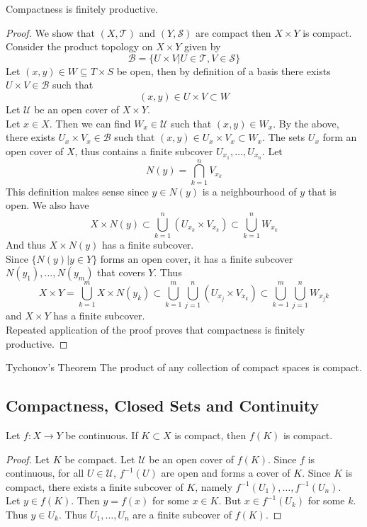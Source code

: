 \documentclass[a4paper]{article}
\begin{document}
\begin{prp}{}{} Compactness is finitely productive. 
\begin{proof}
We show that $(X,\mathcal{T})$ and $(Y,\mathcal{S})$ are compact then $X\times Y$ is compact. Consider the product topology on $X\times Y$ given by $$\mathcal{B}=\{U\times V|U\in\mathcal{T},V\in\mathcal{S}\}$$ Let $(x,y)\in W\subseteq T\times S$ be open, then by definition of a basis there exists $U\times V\in\mathcal{B}$ such that $$(x,y)\in U\times V\subset W$$ Let $\mathcal{U}$ be an open cover of $X\times Y$. \\
Let $x\in X$. Then we can find $W_x\in\mathcal{U}$ such that $(x,y)\in W_x$. By the above, there exists $U_x\times V_x\in\mathcal{B}$ such that $(x,y)\in U_x\times V_x\subset W_x$. The sets $U_x$ form an open cover of $X$, thus contains a finite subcover $U_{x_1},\dots,U_{x_n}$. Let $$N(y)=\bigcap_{k=1}^nV_{x_k}$$ This definition makes sense since $y\in N(y)$ is a neighbourhood of $y$ that is open. We also have $$X\times N(y)\subset\bigcup_{k=1}^n(U_{x_k}\times V_{x_k})\subset\bigcup_{k=1}^nW_{x_k}$$ And thus $X\times N(y)$ has a finite subcover. \\
Since $\{N(y)|y\in Y\}$ forms an open cover, it has a finite subcover $N(y_1),\dots,N(y_m)$ that covers $Y$. Thus $$X\times Y=\bigcup_{k=1}^mX\times N(y_k)\subset\bigcup_{k=1}^m\bigcup_{j=1}^n(U_{x_j}\times V_{x_k})\subset\bigcup_{k=1}^m\bigcup_{j=1}^nW_{x_jk}$$ and $X\times Y$ has a finite subcover. \\
Repeated application of the proof proves that compactness is finitely productive. 
\end{proof}
\end{prp}

\begin{thm}{Tychonov's Theorem}{} The product of any collection of compact spaces is compact. 
\end{thm}

\subsection{Compactness, Closed Sets and Continuity}
\begin{prp}{}{} Let $f:X\to Y$ be continuous. If $K\subset X$ is compact, then $f(K)$ is compact.  
\begin{proof}
Let $K$ be compact. Let $\mathcal{U}$ be an open cover of $f(K)$. Since $f$ is continuous, for all $U\in\mathcal{U}$, $f^{-1}(U)$ are open and forms a cover of $K$. Since $K$ is compact, there exists a finite subcover of $K$, namely $f^{-1}(U_1),\dots,f^{-1}(U_n)$. \\
Let $y\in f(K)$. Then $y=f(x)$ for some $x\in K$. But $x\in f^{-1}(U_k)$ for some $k$. Thus $y\in U_k$. Thus $U_1,\dots,U_n$ are a finite subcover of $f(K)$. 
\end{proof}
\end{prp}
\end{document}
